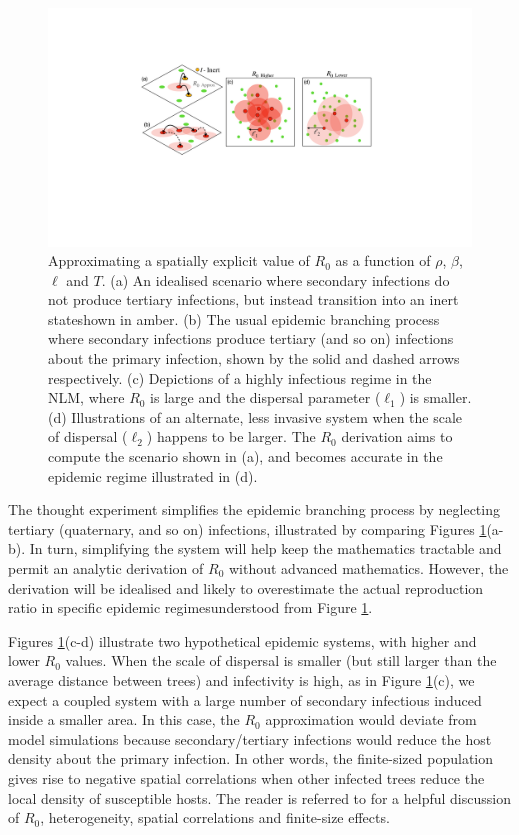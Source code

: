 \begin{figure}
    \centering
    \includegraphics[scale=0.45]{chapter5/figures/fig3a-R0-approx.pdf}
    \caption{
    Approximating a spatially explicit value of $R_0$ as a function of $\rho$, $\beta$, $\ell$ and $T$.
    (a) An idealised scenario where secondary infections do not produce tertiary infections, but instead transition into an inert state\textemdash shown in amber.
    (b) The usual epidemic branching process where secondary infections produce tertiary (and so on) infections about the primary infection, shown by the solid and dashed arrows respectively.
    (c) Depictions of a highly infectious regime in the NLM, where $R_0$ is large and the dispersal parameter ($\ell_1$) is smaller.
    (d) Illustrations of an alternate, less invasive system when the scale of dispersal ($\ell_2$) happens to be larger. 
    The $R_0$ derivation aims to compute the scenario shown in (a), and becomes accurate in the epidemic regime illustrated in (d).
    }
    \label{fig:R0-approx}
\end{figure}

The thought experiment simplifies the epidemic branching process by neglecting tertiary (quaternary, and so on) infections,
illustrated by comparing Figures \ref{fig:R0-approx}(a-b). In turn, simplifying the system will help keep the mathematics tractable and permit an analytic derivation of $R_0$ without advanced mathematics. However, the derivation will be idealised and likely to overestimate the actual reproduction ratio in specific epidemic regimes\textemdash understood from Figure \ref{fig:R0-approx}.

Figures \ref{fig:R0-approx}(c-d) illustrate two hypothetical epidemic systems, with higher and lower $R_0$ values.
When the scale of dispersal is smaller (but still larger than the average distance between trees) and infectivity is high, as in Figure \ref{fig:R0-approx}(c), we expect a coupled system with a large number of secondary infectious induced inside a smaller area. In this case, the $R_0$ approximation would deviate from model simulations because secondary/tertiary infections would reduce the host density about the primary infection.
In other words, the finite-sized population gives rise to negative spatial correlations when other infected trees reduce the local density of susceptible hosts. The reader is referred to \cite{R0-perc-ref} for a helpful discussion of $R_0$, heterogeneity, spatial correlations and finite-size effects.

